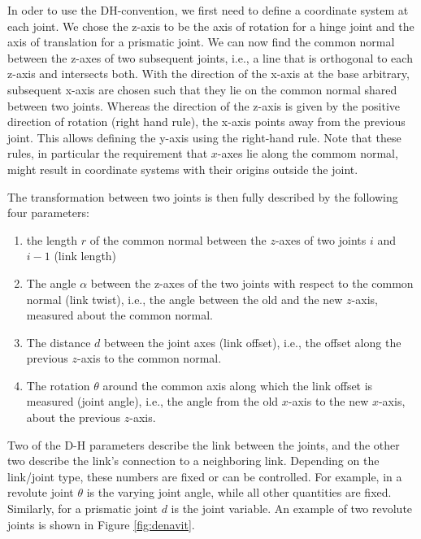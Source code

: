 In oder to use the DH-convention, we first need to define a coordinate system at each joint. We chose the z-axis to be the axis of rotation for a hinge joint and the axis of translation for a prismatic joint. We can now find the common normal between the z-axes of two subsequent joints, i.e., a line that is orthogonal to each z-axis and intersects both. With the direction of the x-axis at the base arbitrary, subsequent x-axis are chosen such that they lie on the common normal shared between two joints. Whereas the direction of the z-axis is given by the positive direction of rotation (right hand rule), the x-axis points away from the previous joint. This allows defining the y-axis using the right-hand rule. Note that these rules, in particular the requirement that $x$-axes lie along the commom normal, might result in coordinate systems with their origins outside the joint. %

The transformation between two joints is then fully described by the following four parameters:
\begin{enumerate}
\item the length $ r$ of the common normal between the $z$-axes of two joints $i$ and $i-1$ (link length)
\item The angle $ \alpha$ between the z-axes of the two joints with respect to the common normal (link twist), i.e., the angle between the old and the new $z$-axis, measured about the common normal.
\item The distance $d$ between the joint axes (link offset), i.e., the offset along the previous $z$-axis to the common normal.
\item The rotation $ \theta$ around the common axis along which the link offset is measured (joint angle), i.e., the angle from the old $x$-axis to the new $x$-axis, about the previous $z$-axis.
\end{enumerate}

Two of the D-H parameters describe the link between the joints, and the other two describe the link's connection to a neighboring link. Depending on the link/joint type, these numbers are fixed or can be controlled. For example, in a revolute joint $ \theta$ is the varying joint angle, while all other quantities are fixed.  Similarly, for a prismatic joint $ d$ is the joint variable. An example of two revolute joints is shown in Figure \ref{fig:denavit}.


